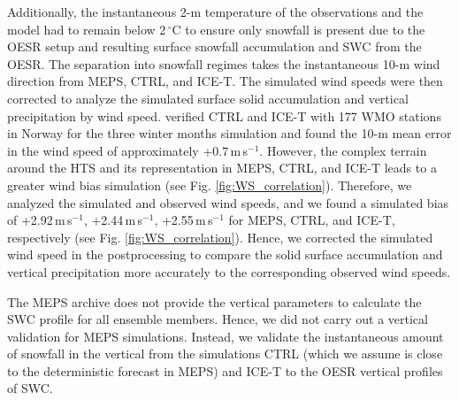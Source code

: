 \documentclass{ametsocV5}
\begin{document}
		Additionally, the instantaneous 2-m temperature of the observations and the model had to remain below 2\,$^{\circ}$C to ensure only snowfall is present due to the OESR setup and resulting surface snowfall accumulation and SWC from the OESR. The separation into snowfall regimes takes the instantaneous 10-m wind direction from MEPS, CTRL, and ICE-T. The simulated wind speeds were then corrected to analyze the simulated surface solid accumulation and vertical precipitation by wind speed. \citet{engdahl_effects_2020} verified CTRL and ICE-T with 177 WMO stations in Norway for the three winter months simulation and found the 10-m mean error in the wind speed of approximately +0.7\,m\,s$^{-1}$. However, the complex terrain around the HTS and its representation in MEPS, CTRL, and ICE-T leads to a greater wind bias simulation (see Fig. \ref{fig:WS_correlation}). Therefore, we analyzed the simulated and observed wind speeds, and we found a simulated bias of +2.92\,m\,s$^{-1}$, +2.44\,m\,s$^{-1}$, +2.55\,m\,s$^{-1}$ for MEPS, CTRL, and ICE-T, respectively (see Fig. \ref{fig:WS_correlation}). Hence, we corrected the simulated wind speed in the postprocessing to compare the solid surface accumulation and vertical precipitation more accurately to the corresponding observed wind speeds. 
		
		
		The MEPS archive does not provide the vertical parameters to calculate the SWC profile for all ensemble members. Hence, we did not carry out a vertical validation for MEPS simulations. Instead, we validate the instantaneous amount of snowfall in the vertical from the simulations CTRL (which we assume is close to the deterministic forecast in MEPS) and ICE-T to the OESR vertical profiles of SWC.
		
\end{document}

